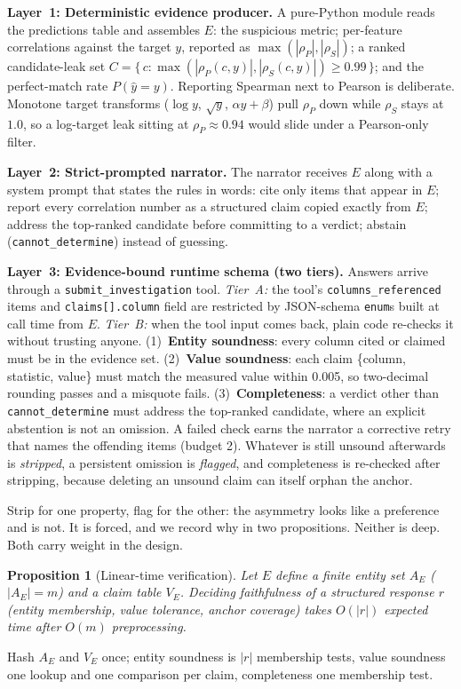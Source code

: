 \documentclass[conference]{IEEEtran}
\newtheorem{proposition}{Proposition}
\begin{document}
\textbf{Layer~1: Deterministic evidence producer.} A pure-Python module reads the predictions table and assembles $E$: the suspicious metric; per-feature correlations against the target $y$, reported as $\max(|\rho_P|,|\rho_S|)$; a ranked candidate-leak set $C = \{\, c : \max(|\rho_P(c,y)|,|\rho_S(c,y)|) \geq 0.99 \,\}$; and the perfect-match rate $P(\hat{y}=y)$. Reporting Spearman next to Pearson is deliberate. Monotone target transforms ($\log y$, $\sqrt{y}$, $\alpha y + \beta$) pull $\rho_P$ down while $\rho_S$ stays at $1.0$, so a log-target leak sitting at $\rho_P \approx 0.94$ would slide under a Pearson-only filter.

\textbf{Layer~2: Strict-prompted narrator.} The narrator receives $E$ along with a system prompt that states the rules in words: cite only items that appear in $E$; report every correlation number as a structured claim copied exactly from $E$; address the top-ranked candidate before committing to a verdict; abstain (\texttt{cannot\_determine}) instead of guessing.

\textbf{Layer~3: Evidence-bound runtime schema (two tiers).} Answers arrive through a \texttt{submit\_investigation} tool. \emph{Tier~A:} the tool's \texttt{columns\_referenced} items and \texttt{claims[].column} field are restricted by JSON-schema \texttt{enum}s built at call time from $E$. \emph{Tier~B:} when the tool input comes back, plain code re-checks it without trusting anyone. (1)~\textbf{Entity soundness}: every column cited or claimed must be in the evidence set. (2)~\textbf{Value soundness}: each claim \{column, statistic, value\} must match the measured value within 0.005, so two-decimal rounding passes and a misquote fails. (3)~\textbf{Completeness}: a verdict other than \texttt{cannot\_determine} must address the top-ranked candidate, where an explicit abstention is not an omission. A failed check earns the narrator a corrective retry that names the offending items (budget 2). Whatever is still unsound afterwards is \emph{stripped}, a persistent omission is \emph{flagged}, and completeness is re-checked after stripping, because deleting an unsound claim can itself orphan the anchor.

Strip for one property, flag for the other: the asymmetry looks like a preference and is not. It is forced, and we record why in two propositions. Neither is deep. Both carry weight in the design.

\begin{proposition}[Linear-time verification]
\label{prop:linear}
Let $E$ define a finite entity set $A_E$ ($|A_E| = m$) and a claim table $V_E$. Deciding faithfulness of a structured response $r$ (entity membership, value tolerance, anchor coverage) takes $O(|r|)$ expected time after $O(m)$ preprocessing.
\end{proposition}
\begin{IEEEproof}
Hash $A_E$ and $V_E$ once; entity soundness is $|r|$ membership tests, value soundness one lookup and one comparison per claim, completeness one membership test.
\end{IEEEproof}
\end{document}
